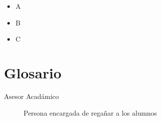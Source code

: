\documentclass[12pt,letterpaper,spanish, xcolor=table]{report}
\begin{document}
\newpage
\appendix
	
%

	
	
\begin{itemize}
	\item A
	\item B
	\item C
\end{itemize}

	


\newpage	
\chapter{Glosario}

\begin{description}
	\item[Asesor Acadámico] Persona encargada de regañar a los alumnos
\end{description}
	
\end{document}
